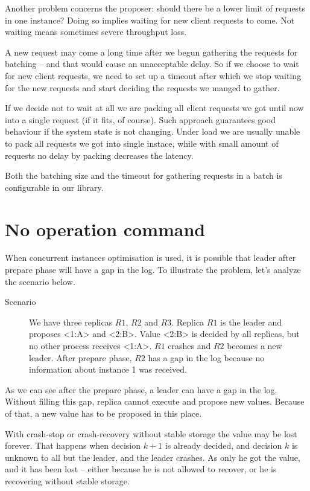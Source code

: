 Another problem concerns the proposer: should there be a lower limit of requests in one instance? Doing so implies waiting for new client requests to come. Not waiting means sometimes severe throughput loss.

A new request may come a long time after we begun gathering the requests for batching -- and that would cause an unacceptable delay. So if we choose to wait for new client requests, we need to set up a timeout after which we stop waiting for the new requests and start deciding the requests we manged to gather.

If we decide not to wait at all we are packing all client requests we got until now into a single request (if it fits, of course). Such approach guarantees good behaviour if the system state is not changing. Under load  we are usually unable to pack all requests we got into single instace, while with small amount of requests no delay by packing decreases the latency.

Both the batching size and the timeout for gathering requests in a batch is configurable in our library.


\section{No operation command}

When concurrent instances optimisation is used, it is possible that leader after prepare phase will have a gap in the log. To illustrate the problem, let's analyze the scenario below.

\begin{description}
  \item [Scenario] We have three replicas $R1$, $R2$ and $R3$. Replica $R1$ is the leader and proposes <1:A> and <2:B>. Value <2:B> is decided by all replicas, but no other process receives <1:A>. $R1$ crashes and $R2$ becomes a new leader. After prepare phase, $R2$ has a gap in the log because no information about instance 1 was received.
\end{description} 

As we can see after the prepare phase, a leader can have a gap in the log. Without filling this gap, replica cannot execute and propose new values. Because of that, a new value has to be proposed in this place.

With crash-stop or crash-recovery without stable storage the value may be lost forever. That happens when decision $k+1$ is already decided, and decision $k$ is unknown to all but the leader, and the leader crashes. As only he got the value, and it has been lost -- either because he is not allowed to recover, or he is recovering without stable storage.

